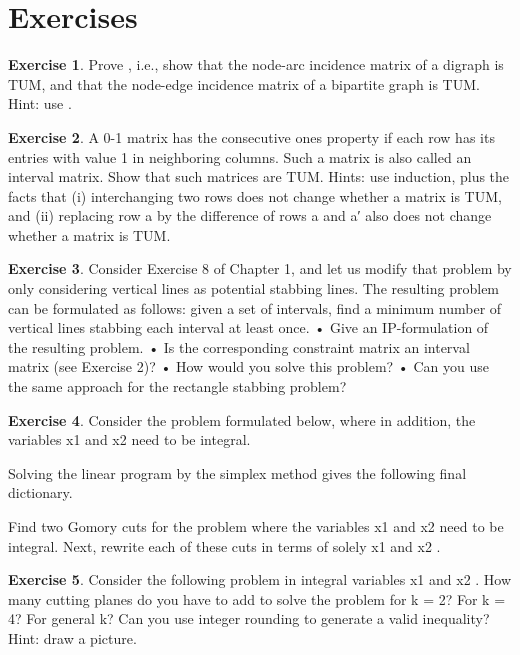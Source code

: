 \documentclass[titlepage]{book}
\theoremstyle{plain}
\theoremstyle{definition}
\newtheorem{exercise}{Exercise}[chapter]
\theoremstyle{remark}
\begin{document}
\section*{Exercises}
\begin{exercise}
Prove , i.e., show that the node-arc incidence matrix of a digraph is TUM, and that the node-edge incidence matrix of a bipartite graph is TUM. Hint: use .
\end{exercise}
\begin{exercise}
A 0-1 matrix has the consecutive ones property if each row has its entries with value 1 in neighboring columns. Such a matrix is also called an interval matrix. Show that such matrices are TUM. Hints: use induction, plus the facts that (i) interchanging two rows does not change whether a matrix is TUM, and (ii) replacing row a by the difference of rows a and a′ also does not change whether a matrix is TUM.
\end{exercise}
\begin{exercise}
Consider Exercise 8 of Chapter 1, and let us modify that problem by only considering vertical lines as
potential stabbing lines. The resulting problem can be formulated as follows: given a set of intervals,
find a minimum number of vertical lines stabbing each interval at least once.
• Give an IP-formulation of the resulting problem.
• Is the corresponding constraint matrix an interval matrix (see Exercise 2)?
• How would you solve this problem?
• Can you use the same approach for the rectangle stabbing problem?
\end{exercise}
\begin{exercise}
Consider the problem formulated below, where in addition, the variables x1 and x2 need to be integral.


Solving the linear program by the simplex method gives the following final dictionary.


Find two Gomory cuts for the problem where the variables x1 and x2 need to be integral. Next, rewrite
each of these cuts in terms of solely x1 and x2 .
\end{exercise}
\begin{exercise}
Consider the following problem in integral variables x1 and x2 . How many cutting planes do you have to
add to solve the problem for k = 2? For k = 4? For general k? Can you use integer rounding to generate
a valid inequality? Hint: draw a picture.

\end{exercise}
\end{document}

